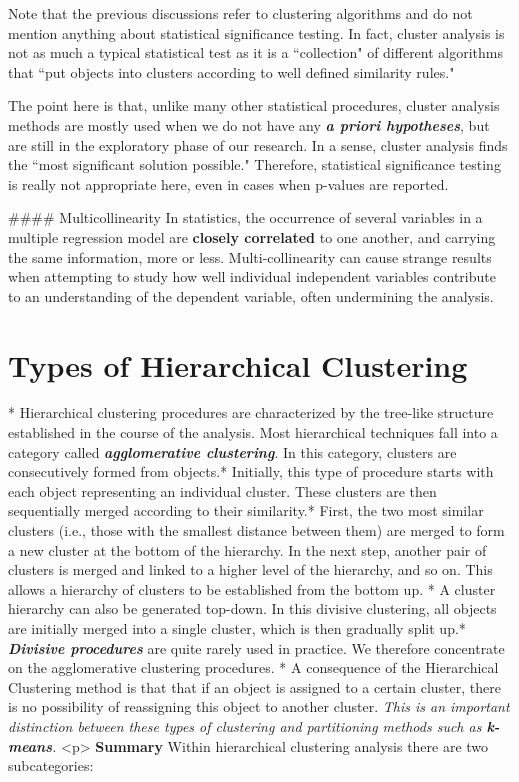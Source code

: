 Note that the previous discussions refer to clustering algorithms and do not mention anything about statistical significance testing. In fact, cluster analysis is not as much a typical statistical test as it is a ``collection" of different algorithms that ``put objects into clusters according to well defined similarity rules."

The point here is that, unlike many other statistical procedures, cluster analysis methods are mostly used when we do not have any \textbf{\textit{a priori hypotheses}}, but are still in the exploratory phase of our research. In a sense, cluster analysis finds the ``most significant solution possible." Therefore, statistical significance testing is really not appropriate here, even in cases when p-values are reported.

#### {Multicollinearity}
In statistics, the occurrence of several  variables in a multiple regression model are \textbf{closely correlated} to one another, and carrying the same information, more or less. Multi-collinearity can cause strange results when attempting to study how well individual independent variables contribute to an understanding of the dependent variable, often undermining the analysis.

\section{Types of Hierarchical Clustering}

* 
Hierarchical clustering procedures are characterized by the tree-like structure
established in the course of the analysis. Most hierarchical techniques fall into a
category called \textbf{\textit{agglomerative clustering}}. In this category, clusters are consecutively
formed from objects.* Initially, this type of procedure starts with each object
representing an individual cluster. These clusters are then sequentially merged
according to their similarity.* First, the two most similar clusters (i.e., those with
the smallest distance between them) are merged to form a new cluster at the bottom
of the hierarchy. In the next step, another pair of clusters is merged and linked to a
higher level of the hierarchy, and so on. This allows a hierarchy of clusters to be
established from the bottom up.
*  A cluster hierarchy can also be generated top-down. In this divisive clustering,
all objects are initially merged into a single cluster, which is then gradually split up.* \textbf{\textit{Divisive procedures}} are quite rarely used in practice. We therefore
concentrate on the agglomerative clustering procedures.
*  A consequence of the Hierarchical Clustering method is that that if an object is assigned
to a certain cluster, there is no possibility of reassigning this object to another
cluster.\textit{ This is an important distinction between these types of clustering and
partitioning methods such as \textbf{\textit{k-means}}.}
<p>
\noindent \textbf{Summary} Within hierarchical clustering analysis there are two subcategories: 


